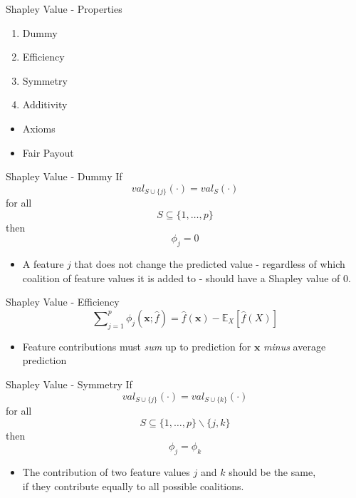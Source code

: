 \begin{frame}{Shapley Value - Properties}
	\begin{enumerate}
		\item Dummy
		\item Efficiency
		\item Symmetry
		\item Additivity
	\end{enumerate}
	\begin{itemize}
		\item Axioms
		\item Fair Payout
	\end{itemize}
\end{frame}
\begin{frame}{Shapley Value - Dummy}
	If
	\begin{equation}
		val_{S\cup\{j\}}(\cdot)=val_S(\cdot)
	\end{equation}
	for all
	\begin{equation*}
		S\subseteq\{1,\ldots,p\}
	\end{equation*}
	then
	\begin{equation*}
		\phi_j=0
	\end{equation*}
	\begin{itemize}
		\item A feature $j$ that does not change the predicted value - regardless of which coalition of feature values it is added to - should have a Shapley value of 0.
	\end{itemize}
\end{frame}
\begin{frame}{Shapley Value - Efficiency}
	\begin{equation}
		\sum\nolimits_{j=1}^p\phi_j\left(\bm{x};\hat{f}\right)=\hat{f}(\bm{x})-\mathbb{E}_X\left[\hat{f}(X)\right]
	\end{equation}
	\begin{itemize}
		\item Feature contributions must \emph{sum} up to prediction for $\bm{x}$ \emph{minus} average prediction
	\end{itemize}
\end{frame}
\begin{frame}{Shapley Value - Symmetry}
	If
	\begin{equation}
		val_{S \cup \{j\}}(\cdot)=val_{S\cup\{k\}}(\cdot)
	\end{equation}
	for all
	\begin{equation*}
		S\subseteq\{1,\ldots, p\} \backslash \{j,k\}
	\end{equation*}
	then
	\begin{equation*}
		\phi_j=\phi_k
	\end{equation*}
	\begin{itemize}
		\item The contribution of two feature values $j$ and $k$ should be the same, 
		\\if they contribute equally to all possible coalitions.
	\end{itemize}
\end{frame}

